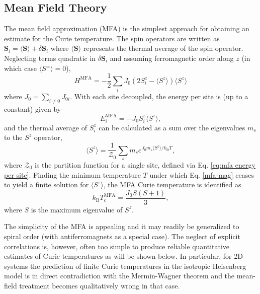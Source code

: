 \documentclass[aps,prb,reprint,floatfix,superscriptaddress]{revtex4-2}
\begin{document}
\subsection{Mean Field Theory}
The mean field approximation (MFA) is the simplest approach for obtaining an estimate for the Curie temperature. The spin operators are written as $\mathbf{S}_i=\langle\mathbf{S}\rangle+\delta\mathbf{S}_i$ where $\langle\mathbf{S}\rangle$ represents the thermal average of the spin operator. Neglecting terms quadratic in $\delta\mathbf{S}_i$ and assuming ferromagnetic order along $z$ (in which case $\langle S^\pm\rangle = 0$),
\begin{equation}\label{eq:H_mf}
    H^\mathrm{MFA} = - \frac{1}{2}\sum_i J_0 \left(2S^z_i - \langle S^z\rangle\right) \langle S^z\rangle
\end{equation}
where $J_0 = \sum_{i\neq 0} J_{0i}$. With each site decoupled, the energy per site is (up to a constant) given by
\begin{equation}
    E_i^\mathrm{MFA} = - J_0 S_i^z \langle S^z \rangle,
    \label{eq:mfa energy per site}
\end{equation}
and the thermal average of $S_i^z$ can be calculated as a sum over the eigenvalues $m_s$ to the $S^z$ operator,
\begin{equation}\label{mfa-mag}
    \langle S^z \rangle = \frac{1}{\mathcal{Z}_0}\sum_s m_s e^{J_0 m_s \langle S^z \rangle/k_\mathrm{B}T},
\end{equation}
where $\mathcal{Z}_0$ is the partition function for a single site, defined via Eq. \eqref{eq:mfa energy per site}. Finding the minimum temperature $T$ under which Eq. \eqref{mfa-mag} ceases to yield a finite solution for $\langle S^z\rangle$, the MFA Curie temperature is identified as \cite{Yosida1996}
\begin{equation}\label{eq:T_mf}
    k_\mathrm{B} T_\mathrm{c}^\mathrm{MFA} = \frac{J_0 S(S+1)}{3} ,
\end{equation}
where $S$ is the maximum eigenvalue of $S^z$.

The simplicity of the MFA is appealing and it may readily be generalized to spiral order (with antiferromagnets as a special case). The neglect of explicit correlations is, however, often too simple to produce reliable quantitative estimates of Curie temperatures as will be shown below. In particular, for 2D systems the prediction of finite Curie temperatures in the isotropic Heisenberg model is in direct contradiction with the Mermin-Wagner theorem \cite{Mermin1966} and the mean-field treatment becomes qualitatively wrong in that case.
\end{document}
